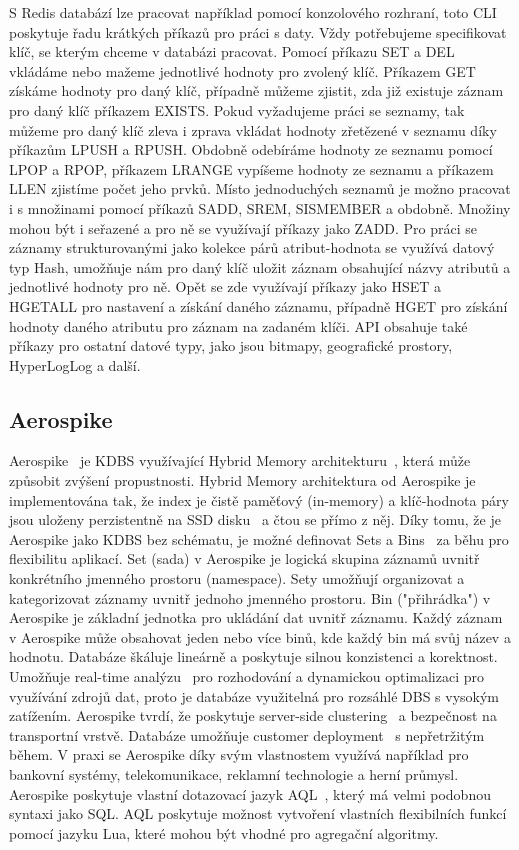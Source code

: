 \documentclass[czech,master,dept460,male,csharp,cpdeclaration]{diploma}
\begin{document}
	S Redis databází lze pracovat například pomocí konzolového rozhraní, toto CLI~\cite{rediscli} poskytuje řadu krátkých příkazů pro práci s daty. Vždy potřebujeme specifikovat klíč, se kterým chceme v databázi pracovat. Pomocí příkazu SET a DEL vkládáme nebo mažeme jednotlivé hodnoty pro zvolený klíč. Příkazem GET získáme hodnoty pro daný klíč, případně můžeme zjistit, zda již existuje záznam pro daný klíč příkazem EXISTS. Pokud vyžadujeme práci se seznamy, tak můžeme pro daný klíč zleva i zprava vkládat hodnoty zřetězené v seznamu díky příkazům LPUSH a RPUSH. Obdobně odebíráme hodnoty ze seznamu pomocí LPOP a RPOP, příkazem LRANGE vypíšeme hodnoty ze seznamu a příkazem LLEN zjistíme počet jeho prvků. Místo jednoduchých seznamů je možno pracovat i s množinami pomocí příkazů SADD, SREM, SISMEMBER a obdobně. Množiny mohou být i seřazené a pro ně se využívají příkazy jako ZADD. Pro práci se záznamy strukturovanými jako kolekce párů atribut-hodnota se využívá datový typ Hash, umožňuje nám pro daný klíč uložit záznam obsahující názvy atributů a jednotlivé hodnoty pro ně. Opět se zde využívají příkazy jako HSET a HGETALL pro nastavení a získání daného záznamu, případně HGET pro získání hodnoty daného atributu pro záznam na zadaném klíči. API obsahuje také příkazy pro ostatní datové typy, jako jsou bitmapy, geografické prostory, HyperLogLog a další.
	
	\subsection{Aerospike} \label{lab-aerospike}
	
	Aerospike~\cite{aerospike} je KDBS využívající Hybrid Memory architekturu~\cite{hybmem-arch}, která může způsobit zvýšení propustnosti. Hybrid Memory architektura od Aerospike je implementována tak, že index je čistě paměťový (in-memory) a klíč-hodnota páry jsou uloženy perzistentně na SSD disku~\cite{ssd-avast} a čtou se přímo z něj. Díky tomu, že je Aerospike jako KDBS bez schématu, je možné definovat Sets a Bins~\cite{aerospike-datamodel} za běhu pro flexibilitu aplikací. Set (sada) v Aerospike je logická skupina záznamů uvnitř konkrétního jmenného prostoru (namespace). Sety umožňují organizovat a kategorizovat záznamy uvnitř jednoho jmenného prostoru. Bin ("přihrádka") v Aerospike je základní jednotka pro ukládání dat uvnitř záznamu. Každý záznam v Aerospike může obsahovat jeden nebo více binů, kde každý bin má svůj název a hodnotu. Databáze škáluje lineárně a poskytuje silnou konzistenci a korektnost. Umožňuje real-time analýzu~\cite{aerospike-rtanalysis} pro rozhodování a dynamickou optimalizaci pro využívání zdrojů dat, proto je databáze využitelná pro rozsáhlé DBS s vysokým zatížením. Aerospike tvrdí, že poskytuje server-side clustering~\cite{aerospike-clustering} a bezpečnost na transportní vrstvě. Databáze umožňuje customer deployment~\cite{aerospike-deployment} s nepřetržitým během. V praxi se Aerospike díky svým vlastnostem využívá například pro bankovní systémy, telekomunikace, reklamní technologie a herní průmysl. Aerospike poskytuje vlastní dotazovací jazyk AQL~\cite{aql}, který má velmi podobnou syntaxi jako SQL. AQL poskytuje možnost vytvoření vlastních flexibilních funkcí pomocí jazyku Lua, které mohou být vhodné pro agregační algoritmy.
	
\end{document}

